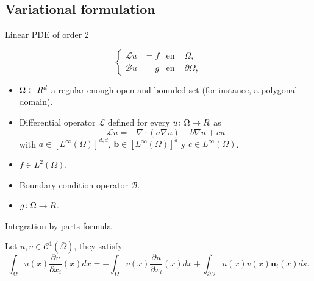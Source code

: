 \subsection{Variational formulation}

\begin{frame}{Linear PDE of order 2}
\begin{block}{}
\begin{equation*}
\label{ecuacion_general}
\left\{
\begin{aligned}
\mathcal{L}u&=f & \text{en } &\Omega, \\
\mathcal{B}u&=g & \text{en } &\partial\Omega,
\end{aligned}
\right.
\end{equation*}
\end{block}

\begin{itemize}\itemsep1em
\item $\Omega\subset \relax R^d$ a regular enough open and bounded set (for instance, a polygonal domain).
\item Differential operator $\mathcal{L}$ defined for every $u\colon\Omega\to\relax R$ as $$\mathcal{L}u=-\nabla\cdot(a\nabla u)+b\nabla u+c u$$ with $a\in [L^\infty(\Omega)]^{d,d}$, $\mathbf{b}\in [L^\infty(\Omega)]^d$ y $c\in L^\infty(\Omega)$.
\item $f\in L^2(\Omega)$.
\item Boundary condition operator $\mathcal{B}$.
\item $g\colon\Omega\to\relax R$.
\end{itemize}

\end{frame}

\begin{frame}{Integration by parts formula}
	\begin{theorem}
		
		Let $u, v\in \mathcal{C}^1(\bar\Omega)$, they satisfy
		\begin{equation*}
		\label{formula_int_por_partes}
		\int_\Omega u(x)\frac{\partial v}{\partial x_i}(x)dx=-\int_\Omega v(x)\frac{\partial u}{\partial x_i}(x)dx+\int_{\partial \Omega}u(x)v(x)\mathbf{n}_i(x)ds.
		\end{equation*}
		
	\end{theorem}
	
\end{frame}

